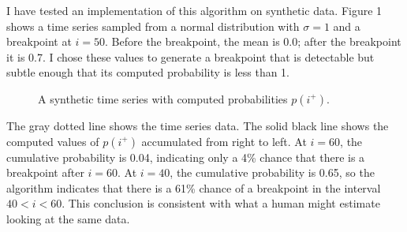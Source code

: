 \documentclass[twocolumn,11pt]{article}
\begin{document}
I have tested an implementation of this algorithm on synthetic data.
Figure 1 shows a time series sampled from a normal distribution with
$\sigma = 1$ and a breakpoint at $i=50$.  Before the breakpoint, the
mean is 0.0; after the breakpoint it is 0.7.  I chose these values to
generate a breakpoint that is detectable but subtle enough that its
computed probability is less than 1.

\begin{figure}[tb]
\centerline{}
\caption{A synthetic time series with computed probabilities $p(i^+)$.}
\label{fig.model}
\end{figure}

The gray dotted line shows the time series data.  The solid black line
shows the computed values of $p(i^+)$ accumulated from right to left.
At $i=60$, the cumulative probability is 0.04, indicating only a 4\%
chance that there is a breakpoint after $i=60$.  At $i=40$, the
cumulative probability is 0.65, so the algorithm indicates that there
is a 61\% chance of a breakpoint in the interval $40 < i < 60$.  This
conclusion is consistent with what a human might estimate looking
at the same data.







\end{document}

